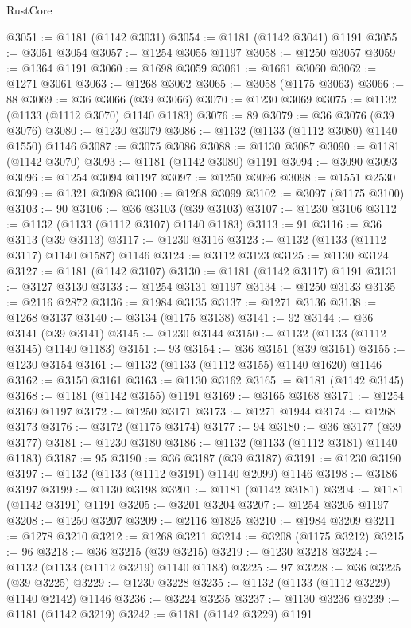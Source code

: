 \begin{lexlean}{RustCore}
\begin{coremodule}
@3051 := @1181 (@1142 @3031)
@3054 := @1181 (@1142 @3041) @1191
@3055 := @3051 @3054
@3057 := @1254 @3055 @1197
@3058 := @1250 @3057
@3059 := @1364 @1191
@3060 := @1698 @3059
@3061 := @1661 @3060
@3062 := @1271 @3061
@3063 := @1268 @3062
@3065 := @3058 (@1175 @3063)
@3066 := 88
@3069 := @36 @3066 (@39 @3066)
@3070 := @1230 @3069
@3075 := @1132 (@1133 (@1112 @3070) @1140 @1183)
@3076 := 89
@3079 := @36 @3076 (@39 @3076)
@3080 := @1230 @3079
@3086 := @1132 (@1133 (@1112 @3080) @1140 @1550) @1146
@3087 := @3075 @3086
@3088 := @1130 @3087
@3090 := @1181 (@1142 @3070)
@3093 := @1181 (@1142 @3080) @1191
@3094 := @3090 @3093
@3096 := @1254 @3094 @1197
@3097 := @1250 @3096
@3098 := @1551 @2530
@3099 := @1321 @3098
@3100 := @1268 @3099
@3102 := @3097 (@1175 @3100)
@3103 := 90
@3106 := @36 @3103 (@39 @3103)
@3107 := @1230 @3106
@3112 := @1132 (@1133 (@1112 @3107) @1140 @1183)
@3113 := 91
@3116 := @36 @3113 (@39 @3113)
@3117 := @1230 @3116
@3123 := @1132 (@1133 (@1112 @3117) @1140 @1587) @1146
@3124 := @3112 @3123
@3125 := @1130 @3124
@3127 := @1181 (@1142 @3107)
@3130 := @1181 (@1142 @3117) @1191
@3131 := @3127 @3130
@3133 := @1254 @3131 @1197
@3134 := @1250 @3133
@3135 := @2116 @2872
@3136 := @1984 @3135
@3137 := @1271 @3136
@3138 := @1268 @3137
@3140 := @3134 (@1175 @3138)
@3141 := 92
@3144 := @36 @3141 (@39 @3141)
@3145 := @1230 @3144
@3150 := @1132 (@1133 (@1112 @3145) @1140 @1183)
@3151 := 93
@3154 := @36 @3151 (@39 @3151)
@3155 := @1230 @3154
@3161 := @1132 (@1133 (@1112 @3155) @1140 @1620) @1146
@3162 := @3150 @3161
@3163 := @1130 @3162
@3165 := @1181 (@1142 @3145)
@3168 := @1181 (@1142 @3155) @1191
@3169 := @3165 @3168
@3171 := @1254 @3169 @1197
@3172 := @1250 @3171
@3173 := @1271 @1944
@3174 := @1268 @3173
@3176 := @3172 (@1175 @3174)
@3177 := 94
@3180 := @36 @3177 (@39 @3177)
@3181 := @1230 @3180
@3186 := @1132 (@1133 (@1112 @3181) @1140 @1183)
@3187 := 95
@3190 := @36 @3187 (@39 @3187)
@3191 := @1230 @3190
@3197 := @1132 (@1133 (@1112 @3191) @1140 @2099) @1146
@3198 := @3186 @3197
@3199 := @1130 @3198
@3201 := @1181 (@1142 @3181)
@3204 := @1181 (@1142 @3191) @1191
@3205 := @3201 @3204
@3207 := @1254 @3205 @1197
@3208 := @1250 @3207
@3209 := @2116 @1825
@3210 := @1984 @3209
@3211 := @1278 @3210
@3212 := @1268 @3211
@3214 := @3208 (@1175 @3212)
@3215 := 96
@3218 := @36 @3215 (@39 @3215)
@3219 := @1230 @3218
@3224 := @1132 (@1133 (@1112 @3219) @1140 @1183)
@3225 := 97
@3228 := @36 @3225 (@39 @3225)
@3229 := @1230 @3228
@3235 := @1132 (@1133 (@1112 @3229) @1140 @2142) @1146
@3236 := @3224 @3235
@3237 := @1130 @3236
@3239 := @1181 (@1142 @3219)
@3242 := @1181 (@1142 @3229) @1191

\end{coremodule}
\end{lexlean}
